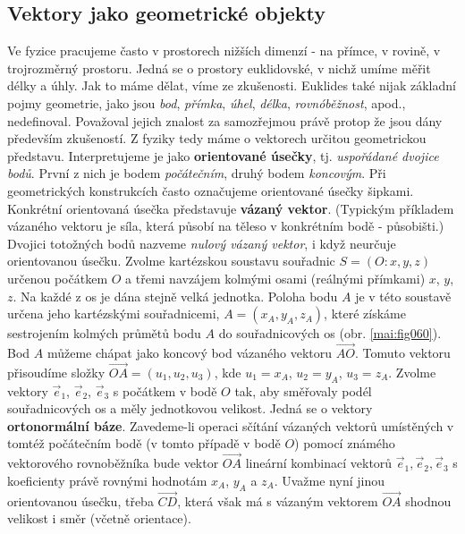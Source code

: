     \subsection{Vektory jako geometrické objekty}\label{mai:IchapIIsecIVsubII}
      Ve fyzice pracujeme často v prostorech nižších dimenzí - na přímce, v rovině, v trojrozměrný
      prostoru. Jedná se o prostory euklidovské, v nichž umíme měřit délky a úhly. Jak to máme dělat,
      víme ze zkušenosti. Euklides také nijak základní pojmy geometrie, jako jsou \emph{bod},
      \emph{přímka}, \emph{úhel}, \emph{délka}, \emph{rovnóběžnost}, apod., nedefinoval. Považoval
      jejich znalost za samozřejmou právě protop že jsou dány především zkušeností. Z fyziky tedy máme
      o vektorech určitou geometrickou představu. Interpretujeme je jako \textbf{orientované úsečky},
      tj. \emph{uspořádané dvojice bodů}. První z nich je bodem \emph{počátečním}, druhý bodem
      \emph{koncovým}. Při geometrických konstrukcích často označujeme orientované úsečky šipkami.
      Konkrétní orientovaná úsečka představuje \textbf{vázaný vektor}. (Typickým příkladem vázaného
      vektoru je síla, která působí na těleso v konkrétním bodě - působišti.) Dvojici totožných bodů
      nazveme \emph{nulový vázaný vektor}, i když neurčuje orientovanou úsečku. Zvolme kartézskou
      soustavu souřadnic \(S = (O: x, y, z)\) určenou počátkem \(O\) a třemi navzájem kolmými osami
      (reálnými přímkami) \(x\), \(y\), \(z\). Na každé z os je dána stejně velká jednotka. Poloha
      bodu \(A\) je v této soustavě určena jeho kartézskými souřadnicemi, \(A = (x_A, y_A, z_A)\),
      které získáme sestrojením kolmých průmětů bodu \(A\) do souřadnicových os (obr.
      \ref{mai:fig060}). Bod \(A\) můžeme chápat jako koncový bod vázaného vektoru
      \(\overrightarrow{AO}\). Tomuto vektoru přisoudíme složky \(\overrightarrow{OA} = (u_1, u_2,
      u_3)\), kde \(u_1 = x_A\), \(u_2 = y_A\), \(u_3 = z_A\). Zvolme vektory \(\vec{e}_1\),
      \(\vec{e}_2\), \(\vec{e}_3\) s počátkem v bodě \(O\) tak, aby směřovaly podél souřadnicových os
      a měly jednotkovou velikost. Jedná se o vektory \textbf{ortonormální báze}. Zavedeme-li operaci
      sčítání vázaných vektorů umístěných v tomtéž počátečním bodě (v tomto případě v bodě \(O\))
      pomocí známého vektorového rovnoběžníka bude vektor \(\overrightarrow{OA}\) lineární kombinací
      vektorů \(\vec{e}_1, \vec{e}_2, \vec{e}_3\) s koeficienty právě rovnými hodnotám \(x_A\),
      \(y_A\) a \(z_A\). Uvažme nyní jinou orientovanou úsečku, třeba \(\overrightarrow{CD}\), která
      však má s vázaným vektorem \(\overrightarrow{OA}\) shodnou velikost i směr (včetně orientace).
